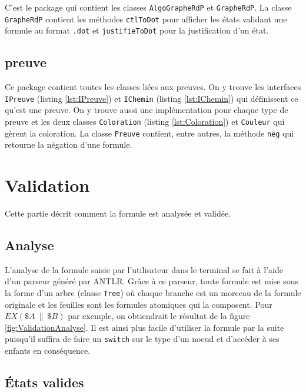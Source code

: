 \documentclass[dvipsnames]{report}
\begin{document}
C'est le package qui contient les classes \texttt{AlgoGrapheRdP} et \texttt{GrapheRdP}. La classe \texttt{GrapheRdP} contient les méthodes \texttt{ctlToDot} pour afficher les états validant une formule au format \texttt{.dot} et \texttt{justifieToDot} pour la justification d'un état.

\subsection{preuve}

Ce package contient toutes les classes liées aux preuves. On y trouve les interfaces \texttt{IPreuve} (listing \ref{lst:IPreuve}) et \texttt{IChemin} (listing \ref{lst:IChemin}) qui définissent ce qu'est une preuve. On y trouve aussi une implémentation pour chaque type de preuve et les deux classes \texttt{Coloration} (listing \ref{lst:Coloration}) et \texttt{Couleur} qui gèrent la coloration. La classe \texttt{Preuve} contient, entre autres, la méthode \texttt{neg} qui retourne la négation d'une formule.

\section{Validation}

Cette partie décrit comment la formule est analysée et validée.

\subsection{Analyse}

L'analyse de la formule saisie par l'utilisateur dans le terminal se fait à l'aide d'un parseur généré par ANTLR. Grâce à ce parseur, toute formule est mise sous la forme d'un arbre (classe \texttt{Tree}) où chaque branche est un morceau de la formule originale et les feuilles sont les formules atomiques qui la composent. Pour $EX(\$A~\|~\$B)$ par exemple, on obtiendrait le résultat de la figure \ref{fig:ValidationAnalyse}. Il est ainsi plus facile d'utiliser la formule par la suite puisqu'il suffira de faire un \texttt{switch} sur le type d'un noeud et d'accéder à ses enfants en conséquence.



\subsection{\'{E}tats valides}
\end{document}
